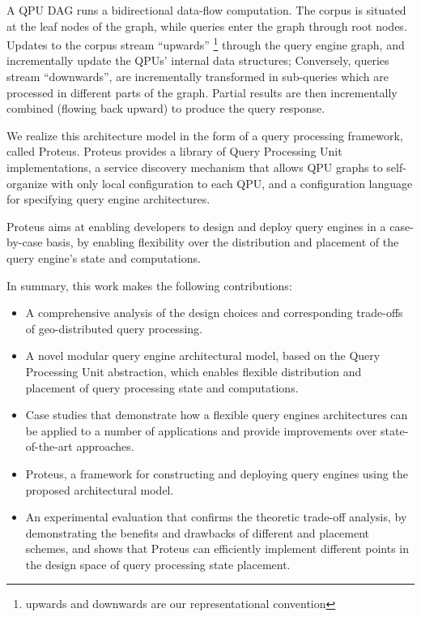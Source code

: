 A QPU DAG runs a bidirectional data-flow computation.
The corpus is situated at the leaf nodes of the graph, while queries enter the graph through root nodes.
Updates to the corpus stream ``upwards''
\footnote{upwards and downwards are our representational convention} through the query engine graph, and incrementally update the QPUs’ internal data structures;
Conversely, queries stream ``downwards'', are incrementally transformed in sub-queries which are processed in different parts of the graph.
Partial results are then incrementally combined (flowing back upward) to produce the query response.

\medskip
\noindent
We realize this architecture model in the form of a query processing framework, called Proteus.
Proteus provides a library of Query Processing Unit implementations,
a service discovery mechanism that allows QPU graphs to self-organize with only local configuration to each QPU,
and a configuration language for specifying query engine architectures.

Proteus aims at enabling developers to design and deploy query engines in a case-by-case basis,
by enabling flexibility over the distribution and placement of the query engine's state and computations.


In summary, this work makes the following contributions:

\begin{itemize}
  \item A comprehensive analysis of the design choices and corresponding trade-offs of geo-distributed query processing.

  \item A novel modular query engine architectural model, based on the Query Processing Unit abstraction,
  which enables flexible distribution and placement of query processing state and computations.

  \item Case studies that demonstrate how a flexible query engines architectures can be applied to a number of applications
  and provide improvements over state-of-the-art approaches.

  \item Proteus, a framework for constructing and deploying query engines using the proposed architectural model.

  \item An experimental evaluation that confirms the theoretic trade-off analysis,
  by demonstrating the benefits and drawbacks of different and placement schemes,
  and shows that Proteus can efficiently implement different points in the design space of query processing state placement.
\end{itemize}

